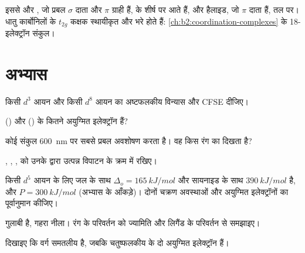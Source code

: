 इससे  और , जो प्रबल $\sigma$ दाता और $\pi$ ग्राही हैं,  के
शीर्ष पर आते हैं, और हैलाइड, जो $\pi$ दाता हैं, तल पर। धातु कार्बोनिलों के
$t_{2g}$ कक्षक स्थायीकृत और भरे होते हैं: \cref{ch:b2:coordination-complexes} के
18-इलेक्ट्रॉन संकुल।

\section{अभ्यास}

\begin{exercise}[$\star$]\label{exo:b2:ligand-field:1}
किसी $d^3$ आयन और किसी $d^8$ आयन का अष्टफलकीय विन्यास और CFSE दीजिए।
\end{exercise}

\begin{exercise}[$\star$]\label{exo:b2:ligand-field:2}
 () और  () के कितने अयुग्मित इलेक्ट्रॉन हैं?
\end{exercise}

\begin{exercise}[$\star$]\label{exo:b2:ligand-field:3}
कोई संकुल \qty{600}{nm} पर सबसे प्रबल अवशोषण करता है। वह किस रंग का दिखता है?
\end{exercise}

\begin{exercise}[$\star$]\label{exo:b2:ligand-field:4}
, , ,  को उनके द्वारा उत्पन्न विपाटन के क्रम में रखिए।
\end{exercise}

\begin{exercise}[$\star\star$]\label{exo:b2:ligand-field:5}
किसी $d^5$ आयन के लिए जल के साथ $\Delta_o = \qty{165}{kJ/mol}$ और सायनाइड के साथ $\qty{390}{kJ/mol}$ है,
और $P = \qty{300}{kJ/mol}$ (अभ्यास के आँकड़े)। दोनों चक्रण अवस्थाओं और अयुग्मित
इलेक्ट्रॉनों का पूर्वानुमान कीजिए।
\end{exercise}

\begin{exercise}[$\star\star$]\label{exo:b2:ligand-field:6}
 गुलाबी है,  गहरा नीला। रंग के परिवर्तन को
ज्यामिति और लिगैंड के परिवर्तन से समझाइए।
\end{exercise}

\begin{exercise}[$\star\star$]\label{exo:b2:ligand-field:7}
दिखाइए कि वर्ग समतलीय   है, जबकि चतुष्फलकीय
 के दो अयुग्मित इलेक्ट्रॉन हैं।
\end{exercise}


